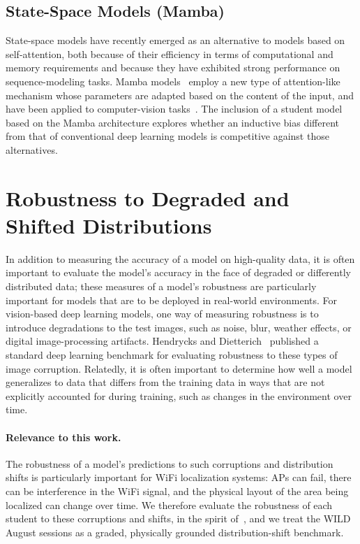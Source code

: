 \subsection{State-Space Models (Mamba)}
\label{sec:lit:mamba}

State-space models have recently emerged as an alternative to models based on self-attention, both
because of their efficiency in terms of computational and memory requirements and because they have
exhibited strong performance on sequence-modeling tasks. Mamba models~\cite{gu2023mamba} employ a new
type of attention-like mechanism whose parameters are adapted based on the content of the input, and
have been applied to computer-vision tasks~\cite{visualmamba2024survey}. The inclusion of a student model
based on the Mamba architecture explores whether an inductive bias different from that of conventional
deep learning models is competitive against those alternatives.

\section{Robustness to Degraded and Shifted Distributions}
\label{sec:lit:robustness}

In addition to measuring the accuracy of a model on high-quality data, it is often important to evaluate
the model's accuracy in the face of degraded or differently distributed data; these measures of a
model's robustness are particularly important for models that are to be deployed in real-world
environments. For vision-based deep learning models, one way of measuring robustness is to introduce
degradations to the test images, such as noise, blur, weather effects, or digital image-processing
artifacts. Hendrycks and Dietterich~\cite{hendrycks2019robustness} published a standard deep learning
benchmark for evaluating robustness to these types of image corruption. Relatedly, it is often important
to determine how well a model generalizes to data that differs from the training data in ways that are
not explicitly accounted for during training, such as changes in the environment over time.

\paragraph{Relevance to this work.} The robustness of a model's predictions to such corruptions and
distribution shifts is particularly important for WiFi localization systems: APs can fail, there can be
interference in the WiFi signal, and the physical layout of the area being localized can change over
time. We therefore evaluate the robustness of each student to these corruptions and shifts, in the
spirit of~\cite{hendrycks2019robustness}, and we treat the WILD August sessions as a graded,
physically grounded distribution-shift benchmark.
